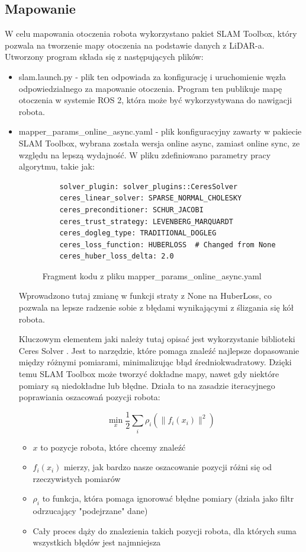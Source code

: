\documentclass[a4paper,twoside,12pt]{book}
\begin{document}
\subsection{Mapowanie}
W celu mapowania otoczenia robota wykorzystano pakiet SLAM Toolbox, który pozwala na tworzenie mapy otoczenia na podstawie danych z LiDAR-a. Utworzony program składa się z następujących plików:
\begin{itemize}
	\item slam.launch.py - plik ten odpowiada za konfigurację i uruchomienie węzła odpowiedzialnego za mapowanie otoczenia. 
	Program ten publikuje mapę otoczenia w systemie ROS 2, która może być wykorzystywana do nawigacji robota.
	\item mapper\_params\_online\_async.yaml - plik konfiguracyjny zawarty w pakiecie SLAM Toolbox, wybrana została wersja online async, zamiast online sync, ze względu na lepszą wydajność. W pliku zdefiniowano parametry pracy algorytmu, takie jak:
	
	\begin{figure}[!hb]
		\centering
	\begin{lstlisting}
    solver_plugin: solver_plugins::CeresSolver
    ceres_linear_solver: SPARSE_NORMAL_CHOLESKY
    ceres_preconditioner: SCHUR_JACOBI
    ceres_trust_strategy: LEVENBERG_MARQUARDT
    ceres_dogleg_type: TRADITIONAL_DOGLEG
    ceres_loss_function: HUBERLOSS  # Changed from None
    ceres_huber_loss_delta: 2.0  
\end{lstlisting}
\caption{Fragment kodu z pliku mapper\_params\_online\_async.yaml}
\label{fig:mapper-params1}
\end{figure}
Wprowadzono tutaj zmianę w funkcji straty z None na HuberLoss, co pozwala na lepsze radzenie sobie z błędami wynikającymi z ślizgania się kół robota.

Kluczowym elementem jaki należy tutaj opisać jest wykorzystanie biblioteki Ceres Solver \cite{bib:Agarwal_Ceres_Solver_2022}. Jest to narzędzie, które pomaga znaleźć najlepsze dopasowanie między różnymi pomiarami, minimalizując błąd średniokwadratowy. Dzięki temu SLAM Toolbox może tworzyć dokładne mapy, nawet gdy niektóre pomiary są niedokładne lub błędne. 
\newline
Działa to na zasadzie iteracyjnego poprawiania oszacowań pozycji robota:

\begin{equation}
\min_x \frac{1}{2}\sum_{i} \rho_i(\|f_i(x_i)\|^2)
\end{equation}


\begin{itemize}
\item $x$ to pozycje robota, które chcemy znaleźć 
\item $f_i(x_i)$ mierzy, jak bardzo nasze oszacowanie pozycji różni się od rzeczywistych pomiarów
\item $\rho_i$ to funkcja, która pomaga ignorować błędne pomiary (działa jako filtr odrzucający "podejrzane" dane)
\item Cały proces dąży do znalezienia takich pozycji robota, dla których suma wszystkich błędów jest najmniejsza
\end{itemize}


\end{itemize}
\end{document}
